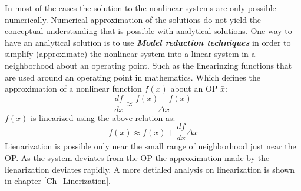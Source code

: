In most of the cases the solution to the nonlinear systems are only possible numerically. Numerical approximation of the solutions do not yield the conceptual understanding that is possible with analytical solutions. One way to have an analytical solution is to use \textbf{\textit{Model reduction techniques}} in order to simplify (approximate) the nonlinear system into a linear system in a neighborhood about an operating point. Such as the linearinzing functions that are used around an operating point in mathematics. Which defines the approximation of a nonlinear function $f(x)$ about an OP $\bar{x}$:
\begin{equation}
	\frac{df}{dx} \approx \frac{f(x) - f(\bar{x})}{\Delta x}
\end{equation}
$f(x)$ is linearized using the above relation as:
\begin{equation}
	f(x) \approx f(\bar{x}) + \frac{df}{dx} \Delta x
\end{equation}
Lienarization is possible only near the small range of neighborhood just near the OP. As the system deviates from the OP the approximation made by the lienarization deviates rapidly. A more detialed analysis on linearization is shown in chapter \ref{Ch_Linerization}.













